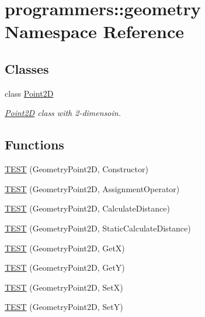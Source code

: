 \hypertarget{namespaceprogrammers_1_1geometry}{}\section{programmers\+:\+:geometry Namespace Reference}
\label{namespaceprogrammers_1_1geometry}
\subsection*{Classes}
\begin{DoxyCompactItemize}
\item 
class \hyperlink{classprogrammers_1_1geometry_1_1Point2D}{Point2D}
\begin{DoxyCompactList}\small\item\em \hyperlink{classprogrammers_1_1geometry_1_1Point2D}{Point2D} class with 2-\/dimensoin. \end{DoxyCompactList}\end{DoxyCompactItemize}
\subsection*{Functions}
\begin{DoxyCompactItemize}
\item 
\hyperlink{namespaceprogrammers_1_1geometry_a626050bae3d3ff3b33dc658f6fce24ae}{T\+E\+ST} (Geometry\+Point2D, Constructor)
\item 
\hyperlink{namespaceprogrammers_1_1geometry_a62f976a8b864ac0c2ef5052de38f40d1}{T\+E\+ST} (Geometry\+Point2D, Assignment\+Operator)
\item 
\hyperlink{namespaceprogrammers_1_1geometry_a760b5042730eff63dfdbf73557a343a1}{T\+E\+ST} (Geometry\+Point2D, Calculate\+Distance)
\item 
\hyperlink{namespaceprogrammers_1_1geometry_adae3c1e731afa4159ad8850ff403e6dc}{T\+E\+ST} (Geometry\+Point2D, Static\+Calculate\+Distance)
\item 
\hyperlink{namespaceprogrammers_1_1geometry_a02af488d5cb15b8520f7718f275879c3}{T\+E\+ST} (Geometry\+Point2D, GetX)
\item 
\hyperlink{namespaceprogrammers_1_1geometry_a32f00e8252e2a529b2103d8d7cec5160}{T\+E\+ST} (Geometry\+Point2D, GetY)
\item 
\hyperlink{namespaceprogrammers_1_1geometry_a5eb75aca8d95b4268b677eb241ba7cce}{T\+E\+ST} (Geometry\+Point2D, SetX)
\item 
\hyperlink{namespaceprogrammers_1_1geometry_a7f7f81dbd8b5856cb37372fb0cdd92b3}{T\+E\+ST} (Geometry\+Point2D, SetY)
\end{DoxyCompactItemize}


